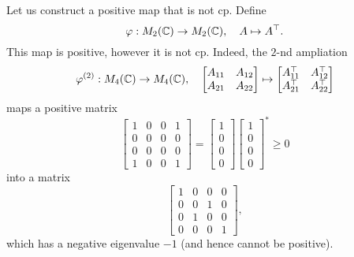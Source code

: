 \begin{example}
    Let us construct a positive map that is not cp. 
    Define $$\varphi: M_2 (\mathbb {C}) \to M_2 (\mathbb {C}),\quad A \mapsto A^\top.$$
    This map is positive, however it is not cp. Indeed, the $2$-nd ampliation 
    $$\varphi^{(2)}:  M_4 (\mathbb {C}) \to M_4 (\mathbb {C}),\quad \begin{bmatrix}
        A_{11} & A_{12}\\
        A_{21} & A_{22}
    \end{bmatrix} \mapsto \begin{bmatrix}
        A_{11}^\top & A_{12}^\top\\
        A_{21}^\top & A_{22}^\top
    \end{bmatrix}$$ maps a positive matrix 
    $$\begin{bmatrix}
        1 & 0 & 0 & 1\\
        0 & 0 & 0 & 0\\
        0 & 0 & 0 & 0\\
        1 & 0 & 0 & 1
    \end{bmatrix} = \begin{bmatrix}
        1 \\ 0 \\ 0 \\ 0
    \end{bmatrix} \begin{bmatrix}
        1 \\ 0 \\ 0 \\ 0
    \end{bmatrix}^* \geq 0$$
    into a matrix 
    $$\begin{bmatrix}
        1 & 0 & 0 & 0\\
        0 & 0 & 1 & 0\\
        0 & 1 & 0 & 0\\
        0 & 0 & 0 & 1
    \end{bmatrix},$$
    which has a negative eigenvalue $-1$ (and hence cannot be positive).
\end{example}

